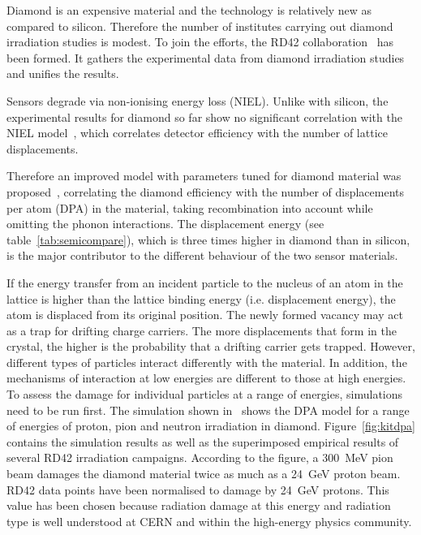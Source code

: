 Diamond is an expensive material and the technology is relatively new as compared to silicon. Therefore the number of institutes carrying out diamond irradiation studies is modest. To join the efforts, the RD42 collaboration~\cite{RD42:00000} has been formed. It gathers the experimental data from diamond irradiation studies and unifies the results. 

Sensors degrade via non-ionising energy loss (NIEL). Unlike with silicon, the experimental results for diamond so far show no significant correlation with the NIEL model~\cite{2002NIMPA}, which correlates detector efficiency with the number of lattice displacements.  

Therefore an improved model with parameters tuned for diamond material was proposed~\cite{Guthoff:2014223}, correlating the diamond efficiency with the number of displacements per atom (DPA) in the material, taking recombination into account while omitting the phonon interactions. The displacement energy (see table~\ref{tab:semicompare}), which is three times higher in diamond than in silicon, is the major contributor to the different behaviour of the two sensor materials.

If the energy transfer from an incident particle to the nucleus of an atom in the lattice is higher than the lattice binding energy (i.e. displacement energy), the atom is displaced from its original position. The newly formed vacancy may act as a trap for drifting charge carriers. The more displacements that form in the crystal, the higher is the probability that a drifting carrier gets trapped. However, different types of particles interact differently with the material. In addition, the mechanisms of interaction at low energies are different to those at high energies. To assess the damage for individual particles at a range of energies, simulations need to be run first. The simulation shown in~\cite{Guthoff:2014223} shows the DPA model for a range of energies of proton, pion and neutron irradiation in diamond. Figure~\ref{fig:kitdpa}  contains the simulation results as well as the superimposed empirical results of several RD42 irradiation campaigns. According to the figure, a 300~MeV pion beam damages the diamond material twice as much as a 24~GeV proton beam. RD42 data points have been normalised to damage by 24~GeV protons. This value has been chosen because radiation damage at this energy and radiation type is well understood at CERN and within the high-energy physics community.

